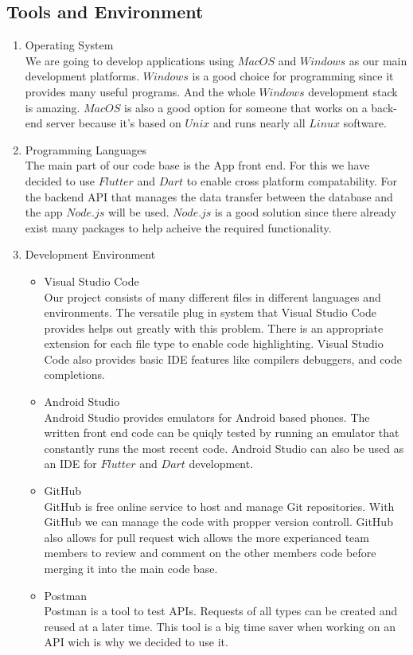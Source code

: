 \documentclass[10pt]{article}
\begin{document}
\begin{multicols*}{2}
\section{Tools and Environment}

\begin{enumerate}
  \item {Operating System} \\
  We are going to develop applications using $MacOS$ and $Windows$ as our main development platforms. $Windows$ is a good choice for programming since it provides many useful programs. And the whole $Windows$ development stack is amazing. $MacOS$ is also a good option for someone that works on a back-end server because it's based on $Unix$ and runs nearly all $Linux$ software.
  
  \item {Programming Languages} \\
  The main part of our code base is the App front end. For this we have decided to use $Flutter$ and $Dart$ to enable cross platform compatability. For the backend API that manages the data transfer between the database and the app $Node.js$ will be used. $Node.js$ is a good solution since there already exist many packages to help acheive the required functionality.
  
  \item {Development Environment}
  \begin{itemize}
    \item {Visual Studio Code} \\
    Our project consists of many different files in different languages and environments. The versatile plug in system that Visual Studio Code provides helps out greatly with this problem. There is an appropriate extension for each file type to enable code highlighting. Visual Studio Code also provides basic IDE features like compilers debuggers, and code completions.
    \item {Android Studio} \\
    Android Studio provides emulators for Android based phones. The written front end code can be quiqly tested by running an emulator that constantly runs the most recent code. Android Studio can also be used as an IDE for $Flutter$ and $Dart$ development.
    \item {GitHub} \\
    GitHub is free online service to host and manage Git repositories. With GitHub we can manage the code with propper version controll. GitHub also allows for pull request wich allows the more experianced team members to review and comment on the other members code before merging it into the main code base.
    \item {Postman} \\
    Postman is a tool to test APIs. Requests of all types can be created and reused at a later time. This tool is a big time saver when working on an API wich is why we decided to use it.
  \end{itemize}


\end{enumerate}
\end{multicols*}
\end{document}
